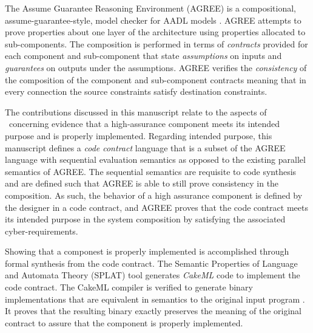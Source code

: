 The Assume Guarantee Reasoning Environment (AGREE) is a compositional, assume-guarantee-style, model checker for AADL models \cite{compositional-analysis-agree,nfm:agree}. 
AGREE attempts to prove properties about one layer of the architecture using properties allocated to sub-components.
The composition is performed in terms of \emph{contracts} provided for each component and sub-component that state \emph{assumptions} on inputs and \emph{guarantees} on outputs under the assumptions.
AGREE verifies the \emph{consistency} of the composition of the component and sub-component contracts meaning that in every connection the source constraints satisfy destination constraints.

The contributions discussed in this manuscript relate to the aspects of \brfcs\ concerning evidence that a high-assurance component meets its intended purpose and is properly implemented.
Regarding intended purpose, this manuscript defines a \emph{code contract} language that is a subset of the AGREE language with sequential evaluation semantics as opposed to the existing parallel semantics of AGREE.
The sequential semantics are requisite to code synthesis and are defined such that AGREE is able to still prove consistency in the composition. 
As such, the behavior of a high assurance component is defined by the designer in a code contract, and AGREE proves that the code contract meets its intended purpose in the system composition by satisfying the associated cyber-requirements.

Showing that a componest is properly implemented is accomplished through formal synthesis from the code contract.
The Semantic Properties of Language and Automata Theory (SPLAT) tool generates \emph{CakeML} code to implement the code contract.
The CakeML compiler is verified to generate binary implementations that are equivalent in semantics to the original input program \cite{cakeml}.
It proves that the resulting binary exactly preserves the meaning of the original contract to assure that the component is properly implemented.